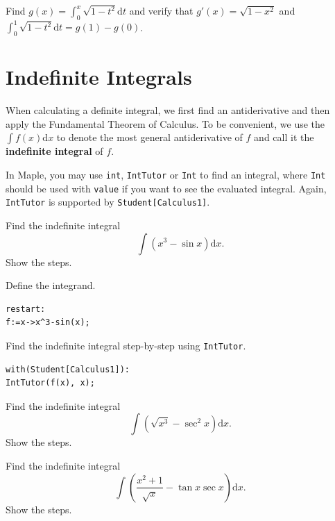 \documentclass[en,11pt,simple]{elegantbook}
\let\BeginKnitrBlock\begin \let\EndKnitrBlock\end
\begin{document}
\BeginKnitrBlock{exercise}{}{}
\protect\hypertarget{exr:unnamed-chunk-143}{}{\label{exr:unnamed-chunk-143} }
Find \(g(x)=\displaystyle\int_0^x\sqrt{1-t^2}\mathrm{d} t\) and verify that \(g'(x)=\sqrt{1-x^2}\) and \(\displaystyle\int_0^1\sqrt{1-t^2}\mathrm{d} t=g(1)-g(0)\).
\EndKnitrBlock{exercise}

\hypertarget{indefinite-integrals}{%
\section{Indefinite Integrals}\label{indefinite-integrals}}

When calculating a definite integral, we first find an antiderivative and then apply the Fundamental Theorem of Calculus. To be convenient, we use the \(\int f(x)\mathrm{d}x\) to denote the most general antiderivative of \(f\) and call it the \textbf{indefinite integral} of \(f\).

In Maple, you may use \texttt{int}, \texttt{IntTutor} or \texttt{Int} to find an integral, where \texttt{Int} should be used with \texttt{value} if you want to see the evaluated integral.
Again, \texttt{IntTutor} is supported by \texttt{Student{[}Calculus1{]}}.

\BeginKnitrBlock{example}{}{}
\protect\hypertarget{exm:unnamed-chunk-144}{}{\label{exm:unnamed-chunk-144} }
Find the indefinite integral
\[
\int(x^3-\sin x)\mathrm{d} x.
\]
Show the steps.
\EndKnitrBlock{example}

\BeginKnitrBlock{solution}{}{}
{}
Define the integrand.

\begin{verbatim}
restart:
f:=x->x^3-sin(x);
\end{verbatim}

Find the indefinite integral step-by-step using \texttt{IntTutor}.

\begin{verbatim}
with(Student[Calculus1]):
IntTutor(f(x), x);
\end{verbatim}
\EndKnitrBlock{solution}

\BeginKnitrBlock{exercise}{}{}
\protect\hypertarget{exr:unnamed-chunk-146}{}{\label{exr:unnamed-chunk-146} }
Find the indefinite integral
\[
\int(\sqrt{x^3}-\sec^2x)\mathrm{d} x.
\]
Show the steps.
\EndKnitrBlock{exercise}

\BeginKnitrBlock{exercise}{}{}
\protect\hypertarget{exr:unnamed-chunk-147}{}{\label{exr:unnamed-chunk-147} }
Find the indefinite integral
\[
\int\left(\frac{x^2+1}{\sqrt{x}}-\tan x\sec x\right)\mathrm{d} x.
\]
Show the steps.
\EndKnitrBlock{exercise}
\end{document}
